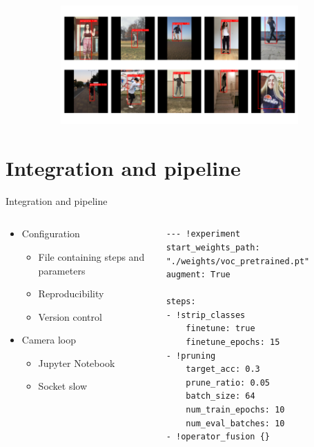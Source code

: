 \documentclass[en]{sdqbeamer}
\begin{document}
\begin{frame}
\begin{figure}
\begin{subfigure}{0.45\textwidth}
    \end{subfigure}
    \hfill
    \begin{subfigure}{0.45\textwidth}
      \centering
      \includegraphics[scale=0.25]{detections}
    \end{subfigure}
  \end{figure}
\end{frame}

\section{Integration and pipeline}
\begin{frame}[fragile]{Integration and pipeline}
  \begin{columns}
    \begin{column}{0.5\textwidth}
      \begin{itemize}
      \item Configuration
        \begin{itemize}
        \item File containing steps and parameters
        \item Reproducibility
        \item Version control
        \end{itemize}
      \item Camera loop
        \begin{itemize}
        \item Jupyter Notebook
        \item Socket slow
        \end{itemize}
      \end{itemize}
    \end{column}
    \begin{column}{0.5\textwidth}
      \begin{lstlisting}
--- !experiment
start_weights_path: "./weights/voc_pretrained.pt"
augment: True

steps:
- !strip_classes
    finetune: true
    finetune_epochs: 15
- !pruning
    target_acc: 0.3
    prune_ratio: 0.05
    batch_size: 64
    num_train_epochs: 10
    num_eval_batches: 10
- !operator_fusion {}
      \end{lstlisting}
    \end{column}
  \end{columns}
\end{frame}
\end{document}
